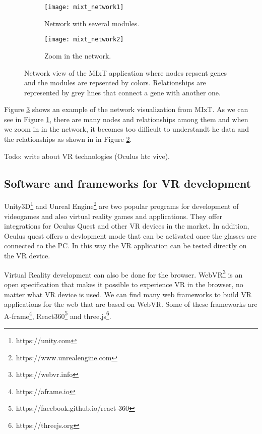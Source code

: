 \begin{figure}[h!]
    \centering%
    \begin{subfigure}[t]{0.5\textwidth}
        \centering%
        \texttt{[image: mixt\_network1]}
        \caption{Network with several modules.}
        \label{fig:mixt_network1}
    \end{subfigure}%
    \begin{subfigure}[t]{0.5\textwidth}
        \centering%
        \texttt{[image: mixt\_network2]}
        \caption{Zoom in the network.}
        \label{fig:mixt_network_zoom}
    \end{subfigure}

    \caption{Network view of the MIxT application where nodes repsent genes and the modules are repsented by colors. Relationships are represented by grey lines that connect a gene with another one.}
    \label{fig:mixt_network}
\end{figure}

Figure \ref{fig:mixt_network} shows an example of the network visualization from MIxT. As we can see in Figure \ref{fig:mixt_network1}, there are many nodes and relationships among them and when we zoom in in the network, it becomes too difficult to understandt he data and the relationships as shown in in Figure \ref{fig:mixt_network_zoom}.

Todo: write about VR technologies (Oculus htc vive).

\subsection{Software and frameworks for VR development}
Unity3D\footnote{https://unity.com} and Unreal Engine\footnote{https://www.unrealengine.com} are two popular programs for development of videogames and also virtual reality games and applications. They offer integrations for Oculus Quest and other VR devices in the market. In addition, Oculus quest offers a devlopment mode that can be activated once the glasses are connected to the PC. In this way the VR application can be tested directly on the VR device.

Virtual Reality development can also be done for the browser. WebVR\footnote{https://webvr.info} is an open specification that makes it possible to experience VR in the browser, no matter what VR device is used. We can find many web frameworks to build VR applications for the web that are based on WebVR. Some of these frameworks are A-frame\footnote{https://aframe.io}, React360\footnote{https://facebook.github.io/react-360} and three.js\footnote{https://threejs.org}.

